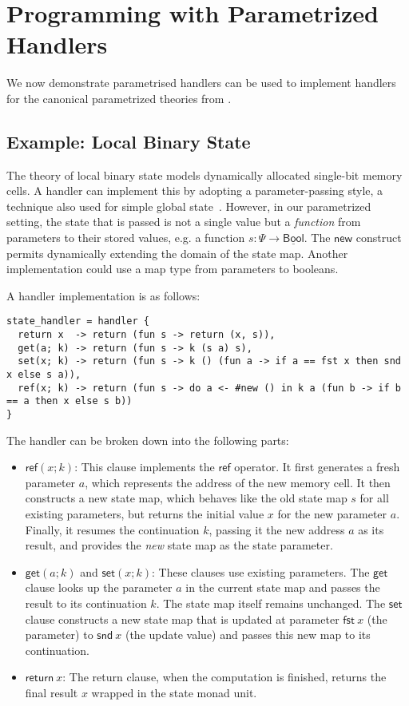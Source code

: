 \documentclass{article}
\theoremstyle{definition}
\theoremstyle{remark}
\newcommand\new{\mathsf{new}}
\newcommand\bool{\mathsf{Bool}}
\newcommand\comp[1]{\underline{#1}}
\newcommand\ret[1]{{\mathsf{return} \ #1}}
\newcommand\get{\mathsf{get}}
\newcommand\set{\mathsf{set}}
\newcommand\newref{\mathsf{ref}}
\newcommand\fst[1]{{\mathsf{fst} \ #1}}
\newcommand\snd[1]{{\mathsf{snd} \ #1}}
\begin{document}
\section{Programming with Parametrized Handlers}

We now demonstrate parametrised handlers can be used to implement handlers for the canonical parametrized theories from .

\subsection{Example: Local Binary State}

The theory of local binary state models dynamically allocated single-bit memory cells.
A handler can implement this by adopting a parameter-passing style, a technique also used for simple global state~\cite{pretnar_introduction_2015}.
However, in our parametrized setting, the state that is passed is not a single value but a \emph{function} from parameters to their stored values,
e.g. a function $s: \Psi \rightarrow \comp \bool$. The $\new$ construct permits dynamically extending the domain of the state map.
Another implementation could use a map type from parameters to booleans.

A handler implementation is as follows:

\begin{lstlisting}
state_handler = handler {
  return x  -> return (fun s -> return (x, s)),
  get(a; k) -> return (fun s -> k (s a) s),
  set(x; k) -> return (fun s -> k () (fun a -> if a == fst x then snd x else s a)),
  ref(x; k) -> return (fun s -> do a <- #new () in k a (fun b -> if b == a then x else s b))
}
\end{lstlisting}

The handler can be broken down into the following parts:
\begin{itemize}
    \item $\newref(x; k)$: This clause implements the $\newref$ operator.
      It first generates a fresh parameter $a$, which represents the address of the new memory cell.
      It then constructs a new state map, which behaves like the old state map $s$ for all existing parameters, but returns the initial value $x$ for the new parameter $a$.
      Finally, it resumes the continuation $k$, passing it the new address $a$ as its result, and provides the \emph{new} state map as the state parameter.
    \item $\get(a; k)$ and $\set(x; k)$: These clauses use existing parameters.
      The $\get$ clause looks up the parameter $a$ in the current state map and passes the result to its continuation $k$. The state map itself remains unchanged.
      The $\set$ clause constructs a new state map that is updated at parameter $\fst x$ (the parameter) to $\snd x$ (the update value) and passes this new map to its continuation.
    \item $\ret{x}$: The return clause, when the computation is finished, returns the final result $x$ wrapped in the state monad unit.
\end{itemize}
\end{document}
